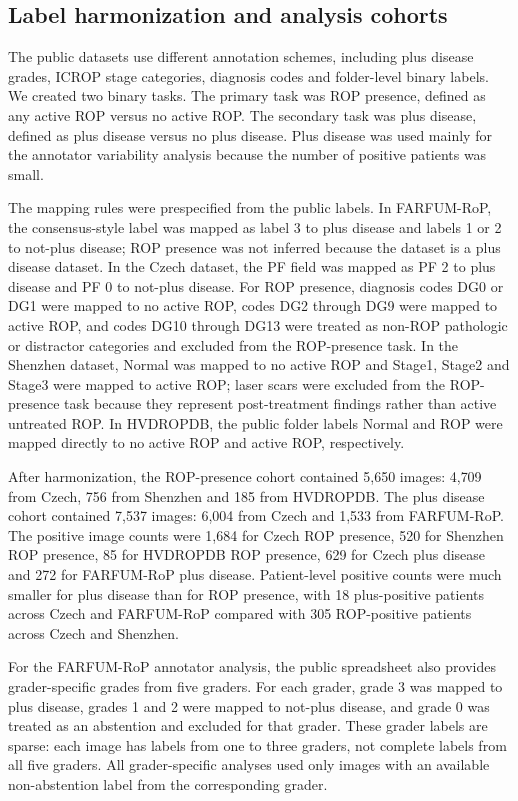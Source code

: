 \documentclass[pdflatex,sn-vancouver,Numbered,iicol]{sn-jnl}
\begin{document}
\subsection{Label harmonization and analysis cohorts}
The public datasets use different annotation schemes, including plus disease
grades, ICROP stage categories, diagnosis codes and folder-level binary labels. We
created two binary tasks. The primary task was ROP presence, defined as
any active ROP versus no active ROP. The secondary task was plus disease, defined
as plus disease versus no plus disease. Plus disease was used mainly for the
annotator variability analysis because the number of positive patients was small.

The mapping rules were prespecified from the public labels. In FARFUM-RoP, the
consensus-style label was mapped as label 3 to plus disease and labels 1 or 2 to
not-plus disease; ROP presence was not inferred because the dataset is a plus
disease dataset. In the Czech dataset, the PF field was mapped as PF 2 to plus
disease and PF 0 to not-plus disease. For ROP presence, diagnosis codes DG0 or
DG1 were mapped to no active ROP, codes DG2 through DG9 were mapped to active
ROP, and codes DG10 through DG13 were treated as non-ROP pathologic or distractor
categories and excluded from the ROP-presence task. In the Shenzhen dataset,
Normal was mapped to no active ROP and Stage1, Stage2 and Stage3 were mapped to
active ROP; laser scars were excluded from the ROP-presence task because they
represent post-treatment findings rather than active untreated ROP. In HVDROPDB,
the public folder labels Normal and ROP were mapped directly to no active ROP and
active ROP, respectively.

After harmonization, the ROP-presence cohort contained 5{,}650 images: 4{,}709
from Czech, 756 from Shenzhen and 185 from HVDROPDB. The plus disease cohort
contained 7{,}537 images: 6{,}004 from Czech and 1{,}533 from FARFUM-RoP. The
positive image counts were 1{,}684 for Czech ROP presence, 520 for Shenzhen ROP
presence, 85 for HVDROPDB ROP presence, 629 for Czech plus disease and 272 for
FARFUM-RoP plus disease. Patient-level positive counts were much smaller for plus
disease than for ROP presence, with 18 plus-positive patients across Czech and
FARFUM-RoP compared with 305 ROP-positive patients across Czech and Shenzhen.

For the FARFUM-RoP annotator analysis, the public spreadsheet also provides
grader-specific grades from five graders. For each grader, grade 3 was mapped to
plus disease, grades 1 and 2 were mapped to not-plus disease, and grade 0 was
treated as an abstention and excluded for that grader. These grader labels are
sparse: each image has labels from one to three graders, not complete labels from
all five graders. All grader-specific analyses used only images with an available
non-abstention label from the corresponding grader.
\end{document}
